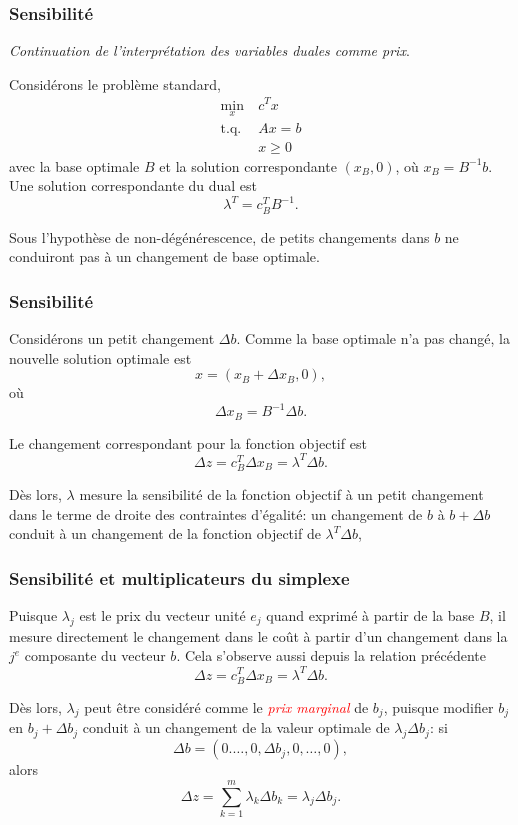 \documentclass[usepdftitle=false]{beamer}
\begin{document}

\begin{frame}
\frametitle{Sensibilité}

{\it Continuation de l'interprétation des variables duales comme prix}.

\mbox{}

Considérons le problème standard,
\begin{align*}
\min_x \ & c^T x \\
\mbox{t.q. } & Ax = b \\
& x \geq 0
\end{align*}
avec la base optimale $B$ et la solution correspondante $(x_B, 0)$, où $x_B = B^{-1}b$. Une solution correspondante du dual est
\[
\lambda^T = c_B^T B^{-1}.
\]

\mbox{}

Sous l'hypothèse de non-dégénérescence, de petits changements dans $b$ ne conduiront pas à un changement de base optimale.

\end{frame}

\begin{frame}
\frametitle{Sensibilité}

Considérons un petit changement $\Delta b$. Comme la base optimale n'a pas changé, la nouvelle solution optimale est
\[
x = (x_B + \Delta x_B, 0),
\]
où
\[
\Delta x_B = B^{-1} \Delta b.
\]

Le changement correspondant pour la fonction objectif est
\[
\Delta z = c_B^T \Delta x_B = \lambda^T \Delta b.
\]

\mbox{}

Dès lors, $\lambda$ mesure la sensibilité de la fonction objectif à un petit changement dans le terme de droite des contraintes d'égalité: un changement de $b$ à $b+\Delta b$ conduit à un changement de la fonction objectif de $\lambda^T \Delta b$,

\end{frame}

\begin{frame}
\frametitle{Sensibilité et multiplicateurs du simplexe}

Puisque $\lambda_j$ est le prix du vecteur unité $e_j$ quand exprimé à partir de la base $B$, il mesure directement le changement dans le coût à partir d'un changement dans la $j^e$ composante du vecteur $b$. Cela s'observe aussi depuis la relation précédente
\[
\Delta z = c_B^T \Delta x_B = \lambda^T \Delta b.
\]

\mbox{}

Dès lors, $\lambda_j$ peut être considéré comme le \textsl{\textcolor{red}{prix marginal}} de $b_j$, puisque modifier $b_j$ en $b_j + \Delta b_j$ conduit à un changement de la valeur optimale de $\lambda_j \Delta b_j$: si
\[
\Delta b = (0.\ldots,0,\Delta b_j,0,\ldots,0),
\]
alors
\[
\Delta z = \sum_{k=1}^m \lambda_k \Delta b_k = \lambda_j \Delta b_j.
\]

\end{frame}
\end{document}
